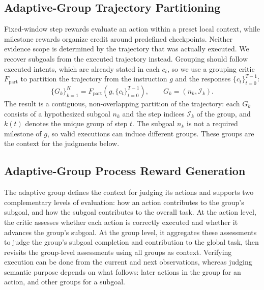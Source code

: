 \subsection{Adaptive-Group Trajectory Partitioning}
\label{sec:trajectory-partitioning}

Fixed-window step rewards evaluate an action within a preset local context, while milestone rewards organize credit around predefined checkpoints. Neither evidence scope is determined by the trajectory that was actually executed. We recover subgoals from the executed trajectory instead. Grouping should follow executed intents, which are already stated in each $c_t$, so we use a grouping critic $F_{\mathrm{part}}$ to partition the trajectory from the instruction $g$ and the responses $\{c_t\}_{t=0}^{T-1}$:
\begin{equation}
    \{G_k\}_{k=1}^{K}
    = F_{\mathrm{part}}(g, \{c_t\}_{t=0}^{T-1}),
    \qquad
    G_k=(n_k,\mathcal{I}_k).
\end{equation}
The result is a contiguous, non-overlapping partition of the trajectory: each $G_k$ consists of a hypothesized subgoal $n_k$ and the step indices $\mathcal{I}_k$ of the group, and $k(t)$ denotes the unique group of step $t$. The subgoal $n_k$ is not a required milestone of $g$, so valid executions can induce different groups. These groups are the context for the judgments below.

\subsection{Adaptive-Group Process Reward Generation}
\label{sec:process-reward-generation}

The adaptive group defines the context for judging its actions and supports two complementary levels of evaluation: how an action contributes to the group's subgoal, and how the subgoal contributes to the overall task. At the action level, the critic assesses whether each action is correctly executed and whether it advances the group's subgoal. At the group level, it aggregates these assessments to judge the group's subgoal completion and contribution to the global task, then revisits the group-level assessments using all groups as context. Verifying execution can be done from the current and next observations, whereas judging semantic purpose depends on what follows: later actions in the group for an action, and other groups for a subgoal.

